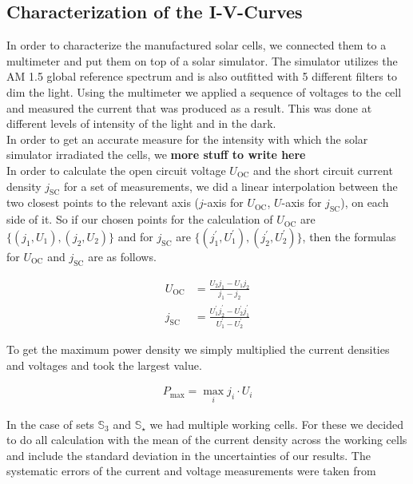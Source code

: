 \documentclass[a4paper,10pt,twocolumn]{article}
\begin{document}
\begin{extract*}

\newcommand{\Uoc}{U_{\text{OC}}}
\newcommand{\jsc}{j_{\text{SC}}}
\newcommand{\Pmax}{P_{\text{max}}}

\section{Characterization of the I-V-Curves}\label{sec:charac}

In order to characterize the manufactured solar cells, we connected them to a multimeter and put them on top of a solar simulator. The simulator utilizes the AM 1.5 global reference spectrum and is also outfitted with 5 different filters to dim the light. Using the multimeter we applied a sequence of voltages to the cell and measured the current that was produced as a result. This was done at different levels of intensity of the light and in the dark.\\
In order to get an accurate measure for the intensity with which the solar simulator irradiated the cells, we \textbf{more stuff to write here}\\
In order to calculate the open circuit voltage $\Uoc$ and the short circuit current density $\jsc$ for a set of measurements, we did a linear interpolation between the two closest points to the relevant axis ($j$-axis for $\Uoc$, $U$-axis for $\jsc$), on each side of it. So if our chosen points for the calculation of $\Uoc$ are $\{(j_1,U_1),(j_2,U_2)\}$ and for $\jsc$ are $\{(j_1^\prime,U_1^\prime),(j_2^\prime,U_2^\prime)\}$, then the formulas for $\Uoc$ and $\jsc$ are as follows.

\begin{align}
	\Uoc &= \frac{U_2 j_1 - U_1 j_2}{j_1-j_2}\\
	\jsc &= \frac{U_1^\prime j_2^\prime - U_2^\prime j_1^\prime}{U_1^\prime-U_2^\prime}
\end{align}

To get the maximum power density we simply multiplied the current densities and voltages and took the largest value.

\begin{align}
	\Pmax = \max_{i} j_i\cdot U_i
\end{align}

In the case of sets $\mathbb{S}_3$ and $\mathbb{S}_\star$ we had multiple working cells. For these we decided to do all calculation with the mean of the current density across the working cells and include the standard deviation in the uncertainties of our results. The systematic errors of the current and voltage measurements were taken from \cite{keithley}


\end{extract*}
\end{document}
